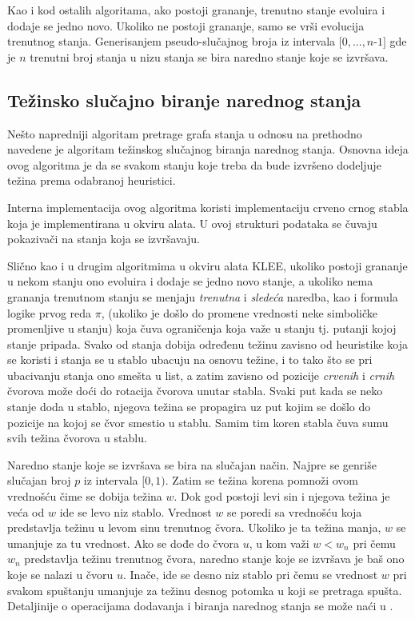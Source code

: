 \documentclass[12pt,oneside]{memoir}
\begin{document}
Kao i kod ostalih algoritama, ako postoji grananje, trenutno stanje evoluira i dodaje se jedno novo. Ukoliko ne postoji grananje, samo se vrši evolucija trenutnog stanja. Generisanjem pseudo-slučajnog broja iz intervala $[0, ..., n $-$ 1]$ gde je $n$ trenutni broj stanja u nizu stanja se bira naredno stanje koje se izvršava.

\subsection{Težinsko slučajno biranje narednog stanja} 
Nešto napredniji algoritam pretrage grafa stanja u odnosu na prethodno navedene je algoritam težinskog slučajnog biranja narednog stanja. Osnovna ideja ovog algoritma je da se svakom stanju koje treba da bude izvršeno dodeljuje težina prema odabranoj heuristici. 

Interna implementacija ovog algoritma koristi implementaciju crveno crnog stabla koja je implementirana u okviru alata. U ovoj strukturi podataka se čuvaju pokazivači na stanja koja se izvršavaju. 

Slično kao i u drugim algoritmima u okviru alata KLEE, ukoliko postoji grananje u nekom stanju ono evoluira i dodaje se jedno novo stanje, a ukoliko nema grananja trenutnom stanju se menjaju \textit{trenutna} i \textit{sledeća} naredba, kao i formula logike prvog reda $\pi$, (ukoliko je došlo do promene vrednosti neke simboličke promenljive u stanju) koja čuva ograničenja koja važe u stanju tj. putanji kojoj stanje pripada. Svako od stanja dobija određenu težinu zavisno od heuristike koja se koristi i stanja se u stablo ubacuju na osnovu težine, i to tako što se pri ubacivanju stanja ono smešta u list, a zatim zavisno od pozicije \textit{crvenih} i \textit{crnih} čvorova može doći do rotacija čvorova unutar stabla. Svaki put kada se neko stanje doda u stablo, njegova težina se propagira uz put kojim se došlo do pozicije na kojoj se čvor smestio u stablu. Samim tim koren stabla čuva sumu svih težina čvorova u stablu. 

Naredno stanje koje se izvršava se bira na slučajan način. Najpre se genriše slučajan broj $p$ iz intervala $[0, 1)$. Zatim se težina korena pomnoži ovom vrednošću čime se dobija težina $w$. Dok god postoji levi sin i njegova težina je veća od $w$ ide se levo niz stablo. Vrednost $w$ se poredi sa vrednošću koja predstavlja težinu u levom sinu trenutnog čvora. Ukoliko je ta težina manja, $w$ se umanjuje za tu vrednost. Ako se dođe do čvora $u$, u kom važi $w < w_n$ pri čemu $w_n$ predstavlja težinu trenutnog čvora, naredno stanje koje se izvršava je baš ono koje se nalazi u čvoru $u$. Inače, ide se desno niz stablo pri čemu se vrednost $w$ pri svakom spuštanju umanjuje za težinu desnog potomka u koji se pretraga spušta. Detaljinije o operacijama dodavanja i biranja narednog stanja se može naći u \cite{klee}. 
\end{document}
